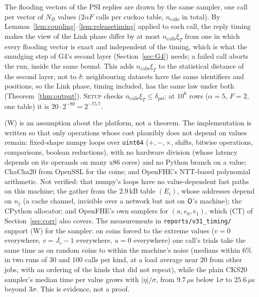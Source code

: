 \begin{remark}
The flooding vectors of the PSI replies are drawn by the same sampler, one call per vector of $N_B$ values ($2\alpha F$ calls per cuckoo table, $n_{\mathrm{calls}}$ in total). By Lemmas~\ref{lem:coupling}--\ref{lem:releasetiming} applied to each call, the reply timing makes the view of the Link phase differ by at most $n_{\mathrm{calls}}\xi_T$ from one in which every flooding vector is exact and independent of the timing, which is what the smudging step of G4's second layer (Section~\ref{sec:G4}) needs; a failed call aborts the run, inside the same bound. This adds $n_{\mathrm{calls}}\xi_T$ to the statistical distance of the second layer, not to $\delta$: neighbouring datasets have the same identifiers and positions, so the Link phase, timing included, has the same law under both (Theorem~\ref{thm:output}). \textsc{Setup} checks $n_{\mathrm{calls}}\xi_T\le\delta_{\mathrm{psi}}$; at $10^6$ rows ($\alpha=5$, $F=2$, one table) it is $20\cdot2^{-80}=2^{-75.7}$.
\end{remark}

\begin{remark}\label{rem:Wstatus}
(W) is an assumption about the platform, not a theorem. The implementation is written so that only operations whose cost plausibly does not depend on values remain: fixed-shape numpy loops over \texttt{uint64} ($+,-,\times$, shifts, bitwise operations, comparisons, boolean reductions), with no hardware division (whose latency depends on its operands on many x86 cores) and no Python branch on a value; ChaCha20 from OpenSSL for the coins; and OpenFHE's NTT-based polynomial arithmetic. Not verified: that numpy's loops have no value-dependent fast paths on this machine; the gather from the $2.9$\,kB table $(E_i)$, whose addresses depend on $n_j$ (a cache channel, invisible over a network but not on $\mathsf{O}$'s machine); the CPython allocator; and OpenFHE's own samplers for $(u,e_0,e_1)$, which (CT) of Section~\ref{sec:corr} also covers. The measurements in \texttt{reports/v31\_timing/} support (W) for the sampler: on coins forced to the extreme values ($v=0$ everywhere, $v=J_v-1$ everywhere, $u=0$ everywhere) one call's trials take the same time as on random coins to within the machine's noise (medians within $6\%$ in two runs of $30$ and $100$ calls per kind, at a load average near $20$ from other jobs, with an ordering of the kinds that did not repeat), while the plain CKS20 sampler's median time per value grows with $|\eta|/\sigma$, from $9.7\,\mu$s below $1\sigma$ to $25.6\,\mu$s beyond $3\sigma$. This is evidence, not a proof.
\end{remark}
